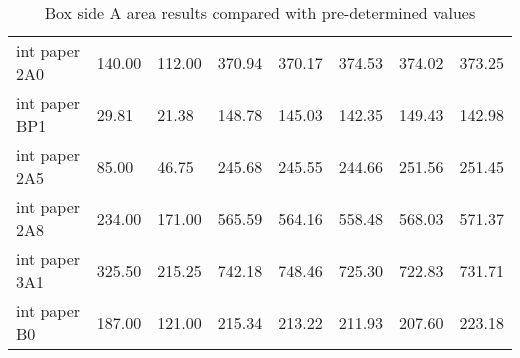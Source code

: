 \documentclass[11pt, twoside, reqno]{book}
\begin{document}
\begin{table}[]
\begin{tabular}{llllllll}
		int paper 2A0       & 140.00           & 112.00           & 370.94    & 370.17     & 374.53     & 374.02     & 373.25     \\
		int paper BP1       & 29.81            & 21.38            & 148.78    & 145.03     & 142.35     & 149.43     & 142.98     \\
		int paper 2A5       & 85.00            & 46.75            & 245.68    & 245.55     & 244.66     & 251.56     & 251.45     \\
		int paper 2A8       & 234.00           & 171.00           & 565.59    & 564.16     & 558.48     & 568.03     & 571.37     \\
		int paper 3A1       & 325.50           & 215.25           & 742.18    & 748.46     & 725.30     & 722.83     & 731.71     \\
		int paper B0        & 187.00           & 121.00           & 215.34    & 213.22     & 211.93     & 207.60     & 223.18    
	\end{tabular}
\caption{Box side A area results compared with pre-determined values}
\end{table}
\end{document}
